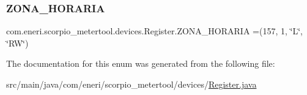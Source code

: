\subsubsection{\texorpdfstring{Z\+O\+N\+A\+\_\+\+H\+O\+R\+A\+R\+IA}{ZONA\_HORARIA}}
{\footnotesize\ttfamily com.\+eneri.\+scorpio\+\_\+metertool.\+devices.\+Register.\+Z\+O\+N\+A\+\_\+\+H\+O\+R\+A\+R\+IA =(157, 1, \char`\"{}L\char`\"{}, \char`\"{}RW\char`\"{})}



The documentation for this enum was generated from the following file\+:\begin{DoxyCompactItemize}
\item 
src/main/java/com/eneri/scorpio\+\_\+metertool/devices/\hyperlink{_register_8java}{Register.\+java}\end{DoxyCompactItemize}
